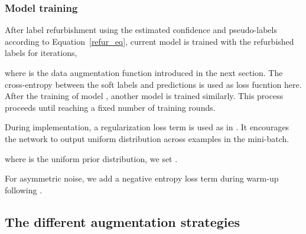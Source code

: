 \documentclass[letterpaper]{article} \usepackage{aaai23}  \usepackage{times}  \usepackage{helvet}  \usepackage{courier}  \usepackage[hyphens]{url}  \usepackage{graphicx} \urlstyle{rm} \def\UrlFont{\rm}  \usepackage{natbib}  \usepackage{caption} \frenchspacing  \setlength{\pdfpagewidth}{8.5in} \setlength{\pdfpageheight}{11in} \usepackage{algorithm}
\begin{document}
\subsubsection{Model training}
After label refurbishment using the estimated confidence and pseudo-labels according to Equation~\ref{refur_eq}, current model  is trained with the refurbished labels for  iterations,

where  is the data augmentation function introduced in the next section.
The cross-entropy between the soft labels and predictions is used as loss fucntion here.
After the training of model , another model  is trained similarly.
This process proceeds until reaching a fixed number of training rounds.

During implementation, a regularization loss term is used as in  \cite{tanaka2018joint,arazo2019unsupervised,li2020dividemix}. 
It encourages the network to output uniform distribution across examples in the mini-batch.

where  is the uniform prior distribution, we set . 

For asymmetric noise, we add a negative entropy loss term during warm-up following \cite{pereyra2017regularizing,li2020dividemix}.


\subsection{The different augmentation strategies} \label{sectionaug}
\end{document}

